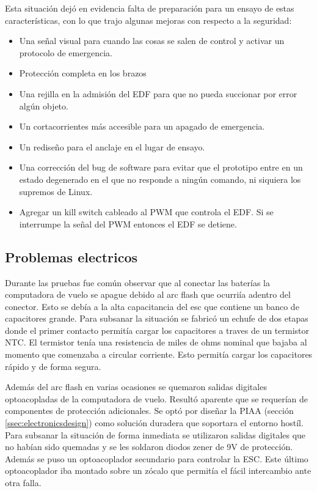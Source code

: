 Esta situación dejó en evidencia falta de preparación para un ensayo de estas características, con lo que trajo algunas mejoras con respecto a la seguridad:

\begin{itemize}
    \item Una señal visual para cuando las cosas se salen de control y activar un protocolo de emergencia.
    \item Protección completa en los brazos
    \item Una rejilla en la admisión del EDF para que no pueda succionar por error algún objeto.
    \item Un cortacorrientes más accesible para un apagado de emergencia.
    \item Un rediseño para el anclaje en el lugar de ensayo.
    \item Una corrección del bug de software para evitar que el prototipo entre en un estado degenerado en el que no responde a ningún comando, ni siquiera los supremos de Linux.
    \item Agregar un kill switch cableado al PWM que controla el EDF. Si se interrumpe la señal del PWM entonces el EDF se detiene.
\end{itemize}


\subsection{Problemas electricos}
Durante las pruebas fue común observar que al conectar las baterías la computadora de vuelo se apague debido al arc flash que ocurriía adentro del conector. Esto se debía a la alta capacitancia
del \gls{esc} que contiene un banco de capacitores grande. Para subsanar la situación se fabricó un echufe de dos etapas donde el primer contacto permitía cargar los capacitores a traves de un termistor NTC. El termistor tenía una resistencia de miles de ohms nominal que bajaba al momento que comenzaba a circular corriente. Esto permitía cargar los capacitores rápido y de forma segura.

Además del arc flash en varias ocasiones se quemaron salidas digitales optoacopladas de la computadora de vuelo. Resultó aparente que se requerían de componentes de protección adicionales.
Se optó por diseñar la PIAA (sección \ref{ssec:electronicsdesign}) como solución duradera que soportara el entorno hostíl. Para subsanar la situación de forma inmediata se utilizaron salidas digitales que no habían sido quemadas y se les soldaron diodos zener de 9V de protección. Además se puso un optoacoplador secundario para controlar la ESC. Este último optoacoplador iba montado sobre un zócalo que permitía el fácil intercambio ante otra falla.


